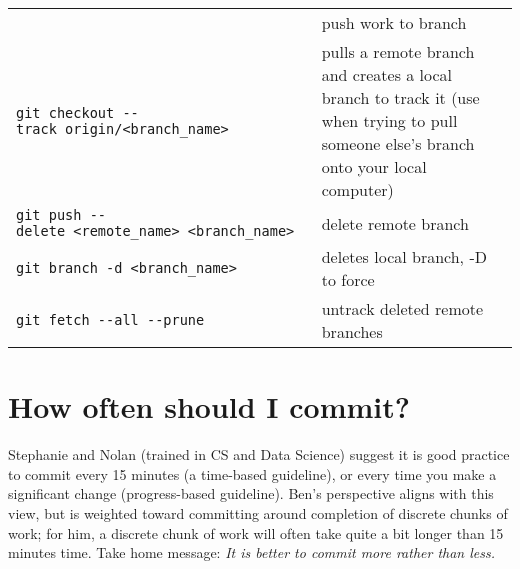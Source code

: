 \documentclass[
]{book}
\begin{document}
\begin{longtable}[]{@{}ll@{}}
\begin{minipage}[t]{0.34\columnwidth}
\end{minipage} & \begin{minipage}[t]{0.60\columnwidth}\raggedright
push work to branch\strut
\end{minipage}\tabularnewline
\begin{minipage}[t]{0.34\columnwidth}\raggedright
\texttt{git\ checkout\ -\/-track\ origin/\textless{}branch\_name\textgreater{}}\strut
\end{minipage} & \begin{minipage}[t]{0.60\columnwidth}\raggedright
pulls a remote branch and creates a local branch to track it (use when trying to pull someone else's branch onto your local computer)\strut
\end{minipage}\tabularnewline
\begin{minipage}[t]{0.34\columnwidth}\raggedright
\texttt{git\ push\ -\/-delete\ \textless{}remote\_name\textgreater{}\ \textless{}branch\_name\textgreater{}}\strut
\end{minipage} & \begin{minipage}[t]{0.60\columnwidth}\raggedright
delete remote branch\strut
\end{minipage}\tabularnewline
\begin{minipage}[t]{0.34\columnwidth}\raggedright
\texttt{git\ branch\ -d\ \textless{}branch\_name\textgreater{}}\strut
\end{minipage} & \begin{minipage}[t]{0.60\columnwidth}\raggedright
deletes local branch, -D to force\strut
\end{minipage}\tabularnewline
\begin{minipage}[t]{0.34\columnwidth}\raggedright
\texttt{git\ fetch\ -\/-all\ -\/-prune}\strut
\end{minipage} & \begin{minipage}[t]{0.60\columnwidth}\raggedright
untrack deleted remote branches\strut
\end{minipage}\tabularnewline
\bottomrule
\end{longtable}

\hypertarget{how-often-should-i-commit}{%
\section{How often should I commit?}\label{how-often-should-i-commit}}

Stephanie and Nolan (trained in CS and Data Science) suggest it is good practice to commit every 15 minutes (a time-based guideline), or every time you make a significant change (progress-based guideline). Ben's perspective aligns with this view, but is weighted toward committing around completion of discrete chunks of work; for him, a discrete chunk of work will often take quite a bit longer than 15 minutes time. Take home message: \emph{It is better to commit more rather than less.}
\end{document}
